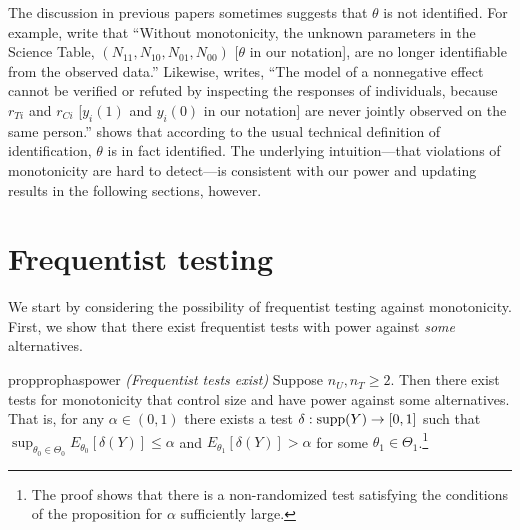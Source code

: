 \documentclass[12pt,reqno]{amsart}
\begin{document}
\begin{rem}
The discussion in previous papers sometimes suggests that $\theta$ is
not identified. For example, \citet{ding_model-free_2019} write that ``Without
monotonicity, the unknown parameters in the Science Table, $(N_{11}, N_{10}, N_{01},
N_{00})$ [$\theta$ in our notation], are no longer identifiable from the observed data.''
Likewise, \citet{rosenbaum_effects_2001} writes, ``The model of a nonnegative effect
cannot be verified or refuted by inspecting the responses of individuals, because $r_{Ti}$
and $r_{Ci}$ [$y_i(1)$ and $y_i(0)$ in our notation] are never jointly observed on the
same person.''  shows that according to the usual technical definition of
identification, $\theta$ is in fact identified. The underlying intuition---that violations of monotonicity are hard to detect---is consistent with our power and updating results in the following sections, however.
\end{rem}

\section{Frequentist testing}

We start by considering the possibility of frequentist testing against monotonicity. First,
we show that there exist frequentist tests with power against \emph{some} alternatives.

\begin{restatable}{prop}{prophaspower}
\label{prop:haspower}
\emph{(Frequentist tests exist)}
Suppose $n_U,n_T \geq 2$. Then there exist tests for monotonicity that control size and have power against some alternatives. That is, for any $\alpha \in (0,1)$ there exists a test $\delta: \operatorname{supp}(Y) \to [0,1]$ such that $\sup_{\theta_0 \in \Theta_0} E_{\theta_0}[\delta(Y)] \leq \alpha$ and $E_{\theta_1}[\delta(Y)] > \alpha$ for some $\theta_1 \in \Theta_1$.\footnote{The proof shows that there is a non-randomized test satisfying the conditions of the proposition for $\alpha$ sufficiently large.}      
\end{restatable}
\end{document}
